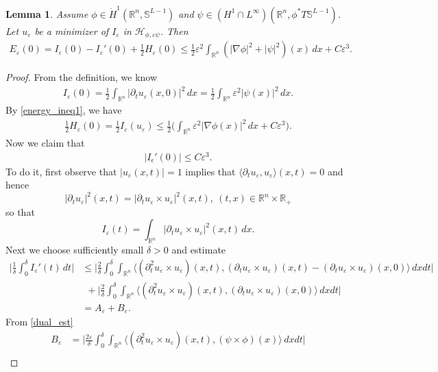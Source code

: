 \documentclass[12pt,twoside,reqno]{amsart}
\newtheorem{lemma}[theorem]{Lemma}
\theoremstyle{definition}              %
\theoremstyle{remark}                  %
\newcommand{\eps}{\varepsilon}
\renewcommand{\1}{\mathbbm{1}}                                      %
\numberwithin{equation}{section}
\numberwithin{definition}{section}
\numberwithin{theorem}{section}
\numberwithin{remark}{section}
\begin{document}
\begin{lemma} \label{sharp_est0} Assume $\phi\in \dot{H}^1(\mathbb R^n,\mathbb S^{L-1})$ 
and $\psi\in ({H}^1\cap L^\infty)(\mathbb R^n,\mathbb \phi^*T\mathbb{S}^{L-1})$.
Let $u_\eps$ be a minimizer of $I_\eps$ in $\mathcal{H}_{\phi,\eps\psi}$.  Then
\begin{align}\label{sharp_est}
 E_\eps(0)
 =I_\eps(0)-I_\eps'(0)+\frac12 H_\eps(0)\le
 \frac12\eps^2\int_{\mathbb{R}^n}
 (|\nabla\phi|^2+|\psi|^2)(x)\,dx+C\eps^3.
\end{align}
    
\end{lemma}
\begin{proof} From the definition, we know
\begin{align}\label{I-est}
I_\eps(0)=\frac12\int_{\mathbb{R}^n}|\partial_tu_\eps(x,0)|^2\,dx
=\frac12\int_{\mathbb{R}^n}\eps^2|\psi(x)|^2\,dx. 
\end{align}
By \eqref{energy_ineq1}, we have 
\begin{align}\label{H-est}
\frac12H_\eps(0)
=\frac12 I_\eps(u_\eps)
\le\frac12\big(\int_{\mathbb{R}^n}
\eps^2|\nabla\phi(x)|^2\,dx+C\eps^3\big).
\end{align}
Now we claim that
\begin{align}\label{I'-est}
 |I_\epsilon'(0)|
 \le C\eps^3.
\end{align}
To do it, first observe that 
$|u_\eps(x,t)|=1$ implies that
$\langle \partial_tu_\eps, u_\eps\rangle (x,t)=0$
and hence
\[
|\partial_tu_\eps|^2(x,t)
=|\partial_tu_\eps\times u_\eps|^2(x,t),
\ (t,x)\in \mathbb{R}^n\times \mathbb{R}_+
\]
so that
\[
I_\eps(t)=\int_{\mathbb{R}^n}
|\partial_tu_\eps\times u_\eps|^2(x,t)\,dx.
\]
Next we choose sufficiently small $\delta>0$ and estimate
\begin{align}\label{energy_est1}
\Big|\frac{1}{\delta}\int_0^\delta I_\eps'(t)\,dt\Big|
&\le \Big|\frac{2}{\delta}\int_0^\delta
\int_{\mathbb{R}^n}\langle (\partial_t^2u_\eps\times 
u_\eps)(x,t), (\partial_tu_\eps\times u_\eps)(x,t)-(\partial_tu_\eps\times u_\eps)(x,0)\rangle\,dxdt\Big|\nonumber\\
&\ \ +\Big|\frac{2}{\delta}\int_0^\delta
\int_{\mathbb{R}^n}\langle (\partial_t^2u_\eps\times u_\eps)(x,t), (\partial_tu_\eps\times u_\eps)(x,0)\rangle\,dxdt\Big|\nonumber\\
&=A_\eps+B_\eps.
\end{align}
From \eqref{dual_est} 
\begin{align*}
 B_\eps&=\Big|\frac{2\eps}{\delta}\int_0^\delta
\int_{\mathbb{R}^n}\langle (\partial_t^2u_\eps\times u_\eps)(x,t), (\psi\times \phi)(x)\rangle\,dxdt\Big|\\

\end{align*}
\end{proof}
\end{document}
